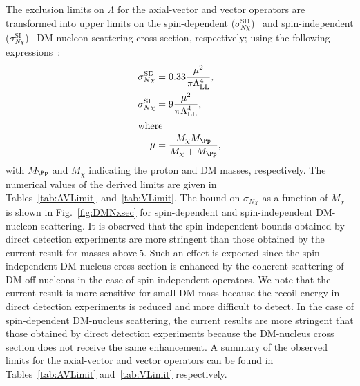 The exclusion limits on $\Lambda$ for the axial-vector and vector operators are transformed into upper limits on
the spin-dependent ($\sigma^\mathrm{SD}_{N\chi}$)~\cite{Super-Kamiokande,
  IceCube, COUPP, SIMPLE, Amole:2015lsj, Archambault:2012pm, Aprile:2013doa} and spin-independent
($\sigma^\mathrm{SI}_{N\chi}$)~\cite{SIMPLE, COUPP, CDMS-II, SuperCDMS, XENON100, LUX, Angloher:2014myn, Angloher:2015ewa}
DM-nucleon scattering cross section, respectively; using the following
expressions~\cite{PhysRevD.85.056011}:
\begin{align}
\sigma_{N\chi}^\mathrm{SD}  & =  0.33 \frac{\mu^{2}}{\pi\Lambda_\mathrm{LL}^{4}}, \\
\sigma_{N\chi}^\mathrm{SI}  & =  9 \frac{\mu^2}{\pi\Lambda_\mathrm{LL}^{4}},\\
\intertext{where}
\mu &= \frac{M_{\chi}M_{\Pp}}{M_{\chi}+M_{\Pp}},
\end{align}
with $M_{\Pp}$ and $M_\chi$ indicating the proton and
DM masses, respectively. The numerical values of the derived limits
are given in Tables~\ref{tab:AVLimit}~and~\ref{tab:VLimit}.  The
bound on $\sigma_{N\chi}$ as a function of $M_\chi$ is shown
in Fig.~\ref{fig:DMNxsec} for spin-dependent and spin-independent
DM-nucleon scattering. It is observed that the spin-independent bounds obtained by
direct detection experiments are more stringent than those obtained by
the current result for masses above$~5$\GeV. Such an effect is expected since
the spin-independent DM-nucleus cross section is enhanced by the coherent
scattering of DM off nucleons in the case of spin-independent operators. We note
that the current result is more sensitive for small DM mass
because the recoil energy in direct detection experiments is reduced and 
more difficult to detect. In the case of spin-dependent
DM-nucleus scattering, the current results are more stringent that those 
obtained by direct detection experiments because the DM-nucleus cross section 
does not receive the same enhancement. A summary of the observed limits for the
axial-vector and vector operators can be found in
Tables~\ref{tab:AVLimit} and~\ref{tab:VLimit} respectively. 


